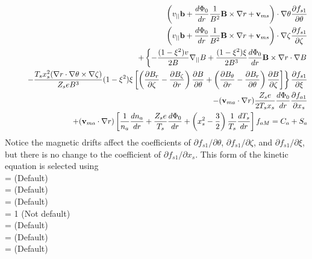 \begin{eqnarray}
&&\left(v_{||}{\mathbf b} + \frac{d\Phi_0}{dr} \frac{1}{B^2} {\mathbf B}\times\nabla r  + {\mathbf v}_{ms}\right) \cdot \nabla \theta \frac{\partial f_{s1}}{\partial \theta} \\
&&\left(v_{||}{\mathbf b} + \frac{d\Phi_0}{dr} \frac{1}{B^2} {\mathbf B}\times\nabla r  + {\mathbf v}_{ms}\right) \cdot \nabla \zeta \frac{\partial f_{s1}}{\partial \zeta} \nonumber \\
&&+ \left\{ - \frac{(1-\xi^2)v}{2B} \nabla_{||} B
+\frac{(1-\xi^2)\xi}{2B^3} \frac{d\Phi_0}{dr}{\mathbf B}\times\nabla r\cdot\nabla B \right. \nonumber \\
&& \left. \hspace{0.25in} -\frac{T_s x_s^2 (\nabla r\cdot\nabla\theta\times\nabla\zeta)}{Z_s e B^3} (1-\xi^2)\xi
\left[ \left( \frac{\partial B_r}{\partial \zeta} - \frac{\partial B_\zeta}{\partial r}\right)\frac{\partial B}{\partial\theta}
+ \left(\frac{\partial B_\theta}{\partial r} - \frac{\partial B_r}{\partial\theta}\right) \frac{\partial B}{\partial\zeta}\right]
\right\}
 \frac{\partial f_{s1}}{\partial \xi} \nonumber \\
&&-({\mathbf v}_{ma} \cdot\nabla r) \frac{Z_s e}{2 T_s x_s} \frac{d\Phi_0}{dr} \frac{\partial f_{a1}}{\partial x_s} \nonumber \\
&&+ ({\mathbf v}_{ma} \cdot \nabla r) \left[ \frac{1}{n_a} \frac{dn_a}{dr} + \frac{Z_s e}{T_s} \frac{d\Phi_0}{dr} + \left(x_s^2-\frac{3}{2}\right) \frac{1}{T_s} \frac{dT_s}{dr}\right] f_{aM}
 = C_a + S_a \nonumber
\end{eqnarray}
Notice the magnetic drifts affect the coefficients of $\partial f_{s1}/\partial \theta$, $\partial f_{s1}/\partial \zeta$, 
and $\partial f_{s1}/\partial \xi$,
but there is no change to the coefficient of $\partial f_{s1}/\partial x_s$.
This form of the kinetic equation is selected using \\
 = \true  \;\;\; (Default) \\
 = \true \;\;\; (Default) \\
 = \false \;\;\; (Default) \\
 = 1 \;\;\; (Not default) \\
 = \false \;\;\; (Default) \\
 = \false \;\;\; (Default) \\
 = \false \;\;\; (Default)




